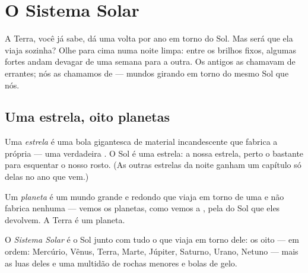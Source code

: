 \chapter{O Sistema Solar}\label{ch:g4:solar-system}

A Terra, você já sabe, dá uma volta por ano em torno do Sol. Mas será
que ela viaja sozinha? Olhe para cima numa noite limpa: entre os
brilhos fixos, algumas  fortes andam devagar de uma semana para
a outra. Os antigos as chamavam de errantes; nós as chamamos de
 --- mundos girando em torno do mesmo Sol que nós.

\section{Uma estrela, oito planetas}

\begin{definition}[Estrela]\label{def:g4:solar-system:star}
Uma \emph{estrela} é uma bola gigantesca de material
incandescente que fabrica a própria  --- uma verdadeira . O Sol é uma estrela: a nossa estrela, perto o bastante para
esquentar o nosso rosto. (As outras estrelas da noite ganham um
capítulo só delas no ano que vem.)
\end{definition}

\begin{definition}[Planeta]\label{def:g4:solar-system:planet}
Um \emph{planeta} é um mundo grande e redondo que
viaja em torno de uma  e não fabrica  nenhuma --- vemos os
planetas, como vemos a , pela  do Sol que eles devolvem. A
Terra é um planeta.
\end{definition}

\begin{definition}\label{def:g4:solar-system:family}
O \emph{Sistema Solar} é o Sol junto com tudo o
que viaja em torno dele: os oito  --- em ordem: Mercúrio,
Vênus, Terra, Marte, Júpiter, Saturno, Urano, Netuno --- mais as
luas deles e uma multidão de rochas menores e bolas de gelo.
\end{definition}

